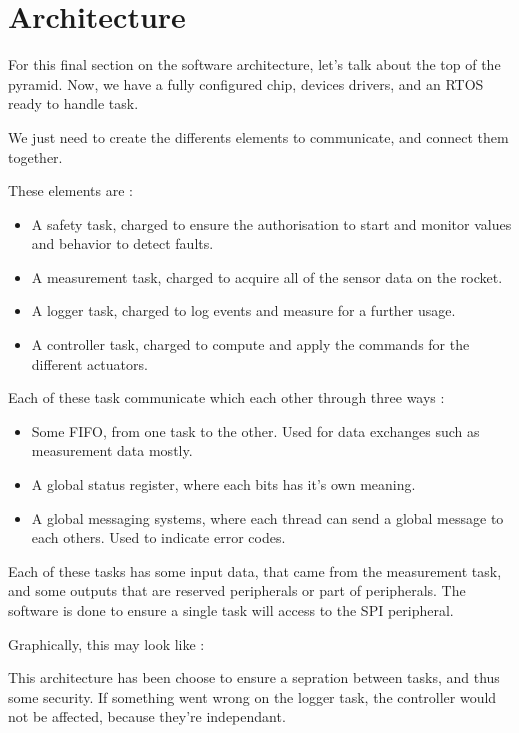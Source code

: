 \section{Architecture}
For this final section on the software architecture, let's talk about the top
of the pyramid. Now, we have a fully configured chip, devices drivers, and an
RTOS ready to handle task.

We just need to create the differents elements to communicate, and connect them
together.

These elements are :

\begin{itemize}[noitemsep]
    \item   A safety task, charged to ensure the authorisation to start and monitor values
          and behavior to detect faults.
    \item   A measurement task, charged to acquire all of the sensor data on the rocket.
    \item   A logger task, charged to log events and measure for a further usage.
    \item   A controller task, charged to compute and apply the commands for the different
          actuators.
\end{itemize}

Each of these task communicate which each other through three ways :

\begin{itemize}[noitemsep]
    \item   Some FIFO, from one task to the other. Used for data exchanges such as
          measurement data mostly.
    \item   A global status register, where each bits has it's own meaning.
    \item   A global messaging systems, where each thread can send a global message to each
          others. Used to indicate error codes.
\end{itemize}

Each of these tasks has some input data, that came from the measurement task,
and some outputs that are reserved peripherals or part of peripherals. The
software is done to ensure a single task will access to the SPI peripheral.

Graphically, this may look like :



This architecture has been choose to ensure a sepration between tasks, and thus
some security. If something went wrong on the logger task, the controller would
not be affected, because they're independant.

